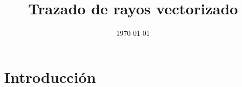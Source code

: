 \documentclass[a4paper]{article}
\title{Trazado de rayos vectorizado}
\date{\today}
\begin{document}



\tableofcontents

\clearpage

\section{Introducción}
\end{document}
